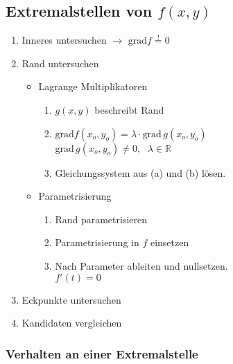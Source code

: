 \subsection{Extremalstellen von \texorpdfstring{$f(x,y)$}{f(x,y)}}
    \vspace{0.25em}
    \begin{enumerate}
        \item Inneres untersuchen $\to$ $\textrm{grad}f \overset{!}{=} 0$
        \item Rand untersuchen
        \begin{itemize}
            \item Lagrange Multiplikatoren
            \begin{enumerate}
                \item $g(x,y)$ beschreibt Rand
                \item $\textrm{grad}f(x_o,y_o) = \lambda \cdot \textrm{grad}\, g(x_o,y_o)$\\[0.25em]
                      \phantom{llll}$\textrm{grad}\, g(x_o,y_o) \neq 0,\phantom{ll} \lambda \in \mathbb{R}$
                \item Gleichungssystem aus (a) und (b) lösen.
            \end{enumerate}
            \item Parametrisierung
            \begin{enumerate}
                \item Rand parametrisieren
                \item Parametrisierung in $f$ einsetzen
                \item Nach Parameter ableiten und nullsetzen.\\[0.25em] \phantom{llll}$f'(t) = 0$
            \end{enumerate}
        \end{itemize}
        \item Eckpunkte untersuchen
        \item Kandidaten vergleichen
    \end{enumerate}
    
\subsubsection{Verhalten an einer Extremalstelle} 

